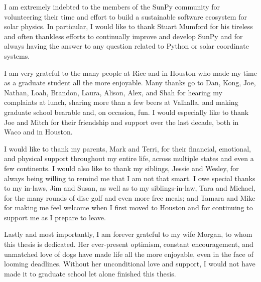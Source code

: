 \begin{acknowledgements}
I am extremely indebted to the members of the SunPy community for volunteering their time and effort to build a sustainable software ecosystem for solar physics. In particular, I would like to thank Stuart Mumford for his tireless and often thankless efforts to continually improve and develop SunPy and for always having the answer to any question related to Python or solar coordinate systems.

I am very grateful to the many people at Rice and in Houston who made my time as a graduate student all the more enjoyable. Many thanks go to Dan, Kong, Joe, Nathan, Loah, Brandon, Laura, Alison, Alex, and Shah for hearing my complaints at lunch, sharing more than a few beers at Valhalla, and making graduate school bearable and, on occasion, fun. I would especially like to thank Joe and Mitch for their friendship and support over the last decade, both in Waco and in Houston.

I would like to thank my parents, Mark and Terri, for their financial, emotional, and physical support throughout my entire life, across multiple states and even a few continents. I would also like to thank my siblings, Jessie and Wesley, for always being willing to remind me that I am not that smart. I owe special thanks to my in-laws, Jim and Susan, as well as to my siblings-in-law, Tara and Michael, for the many rounds of disc golf and even more free meals; and Tamara and Mike for making me feel welcome when I first moved to Houston and for continuing to support me as I prepare to leave.

Lastly and most importantly, I am forever grateful to my wife Morgan, to whom this thesis is dedicated. Her ever-present optimism, constant encouragement, and unmatched love of dogs have made life all the more enjoyable, even in the face of looming deadlines. Without her unconditional love and support, I would not have made it to graduate school let alone finished this thesis.

\end{acknowledgements}
